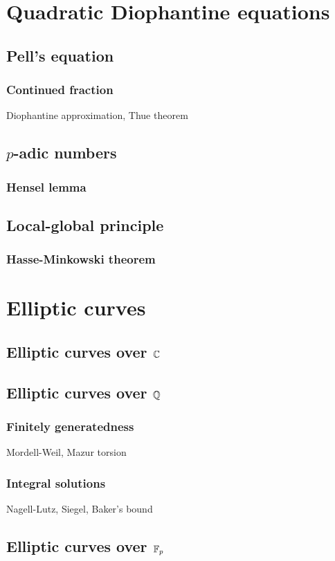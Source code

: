 \documentclass{../../large}
\begin{document}
\part{Quadratic Diophantine equations}
\chapter{Pell's equation}
\section{Continued fraction}
Diophantine approximation, Thue theorem

\chapter{$p$-adic numbers}
\section{Hensel lemma}

\chapter{Local-global principle}
\section{Hasse-Minkowski theorem}




\part{Elliptic curves}
\chapter{Elliptic curves over $\mathbb{C}$}
\chapter{Elliptic curves over $\mathbb{Q}$}
\section{Finitely generatedness}
Mordell-Weil, Mazur torsion
\section{Integral solutions}
Nagell-Lutz, Siegel, Baker's bound
\chapter{Elliptic curves over $\mathbb{F}_p$}
\end{document}

